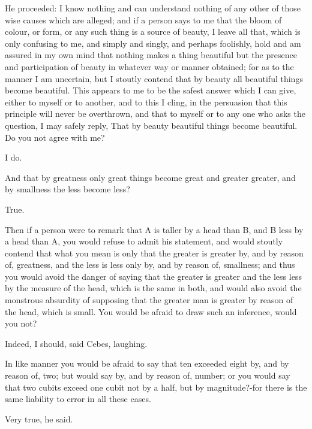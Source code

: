 He proceeded: I know nothing and can understand nothing of any other of
those wise causes which are alleged; and if a person says to me that the
bloom of colour, or form, or any such thing is a source of beauty, I leave
all that, which is only confusing to me, and simply and singly, and
perhaps foolishly, hold and am assured in my own mind that nothing makes a
thing beautiful but the presence and participation of beauty in whatever
way or manner obtained; for as to the manner I am uncertain, but I stoutly
contend that by beauty all beautiful things become beautiful. This appears
to me to be the safest answer which I can give, either to myself or to
another, and to this I cling, in the persuasion that this principle will
never be overthrown, and that to myself or to any one who asks the
question, I may safely reply, That by beauty beautiful things become
beautiful. Do you not agree with me?

I do.

And that by greatness only great things become great and greater greater,
and by smallness the less become less?

True.

Then if a person were to remark that A is taller by a head than B, and B
less by a head than A, you would refuse to admit his statement, and would
stoutly contend that what you mean is only that the greater is greater by,
and by reason of, greatness, and the less is less only by, and by reason
of, smallness; and thus you would avoid the danger of saying that the
greater is greater and the less less by the measure of the head, which is
the same in both, and would also avoid the monstrous absurdity of
supposing that the greater man is greater by reason of the head, which is
small. You would be afraid to draw such an inference, would you not?

Indeed, I should, said Cebes, laughing.

In like manner you would be afraid to say that ten exceeded eight by, and
by reason of, two; but would say by, and by reason of, number; or you
would say that two cubits exceed one cubit not by a half, but by
magnitude?-for there is the same liability to error in all these cases.

Very true, he said.

